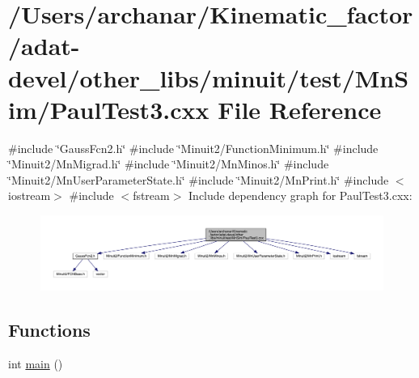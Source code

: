 \hypertarget{adat-devel_2other__libs_2minuit_2test_2MnSim_2PaulTest3_8cxx}{}\section{/\+Users/archanar/\+Kinematic\+\_\+factor/adat-\/devel/other\+\_\+libs/minuit/test/\+Mn\+Sim/\+Paul\+Test3.cxx File Reference}
\label{adat-devel_2other__libs_2minuit_2test_2MnSim_2PaulTest3_8cxx}
{\ttfamily \#include \char`\"{}Gauss\+Fcn2.\+h\char`\"{}}\newline
{\ttfamily \#include \char`\"{}Minuit2/\+Function\+Minimum.\+h\char`\"{}}\newline
{\ttfamily \#include \char`\"{}Minuit2/\+Mn\+Migrad.\+h\char`\"{}}\newline
{\ttfamily \#include \char`\"{}Minuit2/\+Mn\+Minos.\+h\char`\"{}}\newline
{\ttfamily \#include \char`\"{}Minuit2/\+Mn\+User\+Parameter\+State.\+h\char`\"{}}\newline
{\ttfamily \#include \char`\"{}Minuit2/\+Mn\+Print.\+h\char`\"{}}\newline
{\ttfamily \#include $<$iostream$>$}\newline
{\ttfamily \#include $<$fstream$>$}\newline
Include dependency graph for Paul\+Test3.\+cxx\+:
\nopagebreak
\begin{figure}[H]
\begin{center}
\leavevmode
\includegraphics[width=350pt]{db/dd8/adat-devel_2other__libs_2minuit_2test_2MnSim_2PaulTest3_8cxx__incl}
\end{center}
\end{figure}
\subsection*{Functions}
\begin{DoxyCompactItemize}
\item 
int \mbox{\hyperlink{adat-devel_2other__libs_2minuit_2test_2MnSim_2PaulTest3_8cxx_ae66f6b31b5ad750f1fe042a706a4e3d4}{main}} ()
\end{DoxyCompactItemize}


